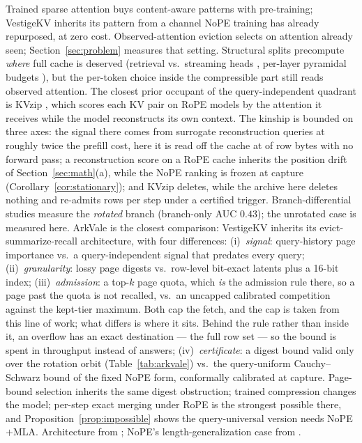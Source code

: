 Trained sparse attention \citep{yuan-etal-2025-native,lu2025moba} buys
content-aware patterns with pre-training; VestigeKV inherits its pattern
from a channel NoPE training has already repurposed, at zero cost.
Observed-attention eviction
\citep{zhang2023h2oheavyhitteroracleefficient,NEURIPS2024_28ab4182,oren2024transformersmultistaternns,ICLR2024_5e5fd18f} selects on
attention already seen; Section~\ref{sec:problem} measures that setting.
Structural splits precompute \emph{where} full cache is deserved
(retrieval vs.\ streaming heads \citep{xiao2025duoattention}, per-layer
pyramidal budgets \citep{cai2024pyramidkv}), but the per-token choice
inside the compressible part still reads observed attention. The closest prior occupant of the query-independent quadrant is
KVzip \citep{kim2025kvzip}, which scores each KV pair on RoPE models by the
attention it receives while the model reconstructs its own context. The
kinship is bounded on three axes: the signal there comes from surrogate
reconstruction queries at roughly twice the prefill cost, here it is read
off the cache at \readCost{} of row bytes with no forward pass; a
reconstruction score on a RoPE cache inherits the position drift of
Section~\ref{sec:math}(a), while the NoPE ranking is frozen at capture
(Corollary~\ref{cor:stationary}); and KVzip deletes, while the archive
here deletes nothing and re-admits rows per step under a certified trigger. Branch-differential studies
\citep{ma2026irminsulmlanativepositionindependentcaching,ma2026kameraunifiedpositioninvariantmultimodal} measure the \emph{rotated} branch
(branch-only AUC $0.43$); the unrotated case is measured here. ArkVale
\citep{chen2024arkvale} is the closest comparison: VestigeKV inherits its
evict-summarize-recall architecture, with four differences:
(i)~\emph{signal}: query-history page importance
vs.\ a query-independent signal that predates every query;
(ii)~\emph{granularity}: lossy page digests vs.\ row-level bit-exact
latents plus a 16-bit index;
(iii)~\emph{admission}: a top-$k$ page quota, which \emph{is} the admission
rule there, so a page past the quota is not recalled, vs.\ an uncapped
calibrated competition against the kept-tier maximum. Both cap the fetch, and
the cap is taken from this line of work; what differs is where it sits. Behind
the rule rather than inside it, an overflow has an exact destination --- the
full row set --- so the bound is spent in throughput instead of answers;
(iv)~\emph{certificate}: a digest bound valid only over the rotation
orbit (Table~\ref{tab:arkvale}) vs.\ the query-uniform Cauchy--Schwarz
bound of the fixed NoPE form, conformally calibrated at capture.
Page-bound selection \citep{tang2024questqueryawaresparsityefficient} inherits the same digest
obstruction; trained compression
\citep{lin2025matryoshkakvadaptivekvcompression,gelberg2026trainingtransformerskvcache} changes the model;
per-step exact merging under RoPE \citep{tian2025keepkvachievingperiodiclossless} is the strongest
possible there, and Proposition~\ref{prop:impossible} shows the query-universal version
needs NoPE$+$MLA. Architecture from \citep{deepseekai2024deepseekv2strongeconomicalefficient,kimiteam2025kimilinearexpressiveefficient}; NoPE's length-generalization case from
\citep{kazemnejad2023impactpositionalencodinglength,wang2024lengthgeneralizationcausaltransformers}.

